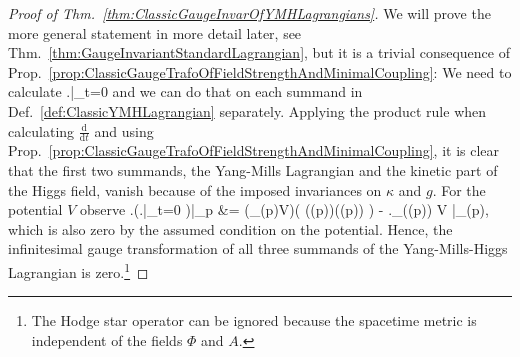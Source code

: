 \begin{proof}[Proof of Thm.~\ref{thm:ClassicGaugeInvarOfYMHLagrangians}]
\leavevmode\newline
We will prove the more general statement in more detail later, see Thm.~\ref{thm:GaugeInvariantStandardLagrangian}, but it is a trivial consequence of Prop.~\ref{prop:ClassicGaugeTrafoOfFieldStrengthAndMinimalCoupling}: We need to calculate
\bas
\mleft.\mright|_{t=0}
\eas
and we can do that on each summand in Def.~\ref{def:ClassicYMHLagrangian} separately. Applying the product rule when calculating $\frac{\mathrm{d}}{\mathrm{d}t}$ and using Prop.~\ref{prop:ClassicGaugeTrafoOfFieldStrengthAndMinimalCoupling}, it is clear that the first two summands, the Yang-Mills Lagrangian and the kinetic part of the Higgs field, vanish because of the imposed invariances on $\kappa$ and $g$. For the potential $V$ observe
\bas
\mleft.\mleft(\mleft.\mright|_{t=0}
\mright)\mright|_p
&=
\mleft(_{\Phi(p)}V\mright)\mleft( \psi\bigl(\varepsilon(p)\bigr)\bigl(\Phi(p)\bigr) \mright)
- \mleft._{\gamma\mleft(\epsilon(p)\mright)} V \mright|_{\Phi(p)},
\eas
which is also zero by the assumed condition on the potential. Hence, the infinitesimal gauge transformation of all three summands of the Yang-Mills-Higgs Lagrangian is zero.\footnote{The Hodge star operator can be ignored because the spacetime metric is independent of the fields $\Phi$ and $A$.}
\end{proof}

